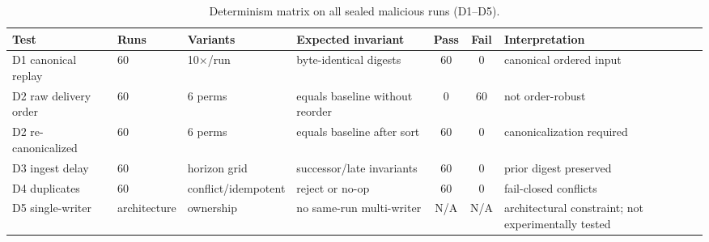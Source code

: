 \begin{table}[!t]
\caption{Determinism matrix on all \DetNRuns{} sealed malicious runs (D1--D5).}
\label{tab:determinism}
\centering
\scriptsize
\setlength{\tabcolsep}{3pt}
\begin{tabular}{@{}lp{}p{}p{}ccp{}@{}}
\toprule
\textbf{Test} & \textbf{Runs} & \textbf{Variants} & \textbf{Expected invariant} & \textbf{Pass} & \textbf{Fail} & \textbf{Interpretation} \\
\midrule
D1 canonical replay & 60 & 10$\times$/run & byte-identical digests & 60 & 0 & canonical ordered input \\
D2 raw delivery order & 60 & 6 perms & equals baseline without reorder & 0 & 60 & not order-robust \\
D2 re-canonicalized & 60 & 6 perms & equals baseline after sort & 60 & 0 & canonicalization required \\
D3 ingest delay & 60 & horizon grid & successor/late invariants & 60 & 0 & prior digest preserved \\
D4 duplicates & 60 & conflict/idempotent & reject or no-op & 60 & 0 & fail-closed conflicts \\
D5 single-writer & architecture & ownership & no same-run multi-writer & N/A & N/A & architectural constraint; not experimentally tested \\
\bottomrule
\end{tabular}
\end{table}
